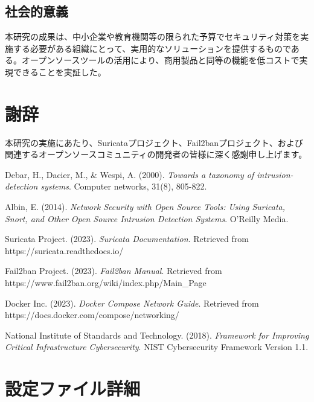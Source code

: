 \documentclass[12pt,a4paper]{article}
\begin{document}
\subsection{社会的意義}

本研究の成果は、中小企業や教育機関等の限られた予算でセキュリティ対策を実施する必要がある組織にとって、実用的なソリューションを提供するものである。オープンソースツールの活用により、商用製品と同等の機能を低コストで実現できることを実証した。

\section*{謝辞}

本研究の実施にあたり、Suricataプロジェクト、Fail2banプロジェクト、および関連するオープンソースコミュニティの開発者の皆様に深く感謝申し上げます。

\begin{thebibliography}{9}

Debar, H., Dacier, M., \& Wespi, A. (2000). 
\textit{Towards a taxonomy of intrusion-detection systems}. 
Computer networks, 31(8), 805-822.

Albin, E. (2014). 
\textit{Network Security with Open Source Tools: Using Suricata, Snort, and Other Open Source Intrusion Detection Systems}. 
O'Reilly Media.

Suricata Project. (2023). 
\textit{Suricata Documentation}. 
Retrieved from https://suricata.readthedocs.io/

Fail2ban Project. (2023). 
\textit{Fail2ban Manual}. 
Retrieved from https://www.fail2ban.org/wiki/index.php/Main\_Page

Docker Inc. (2023). 
\textit{Docker Compose Network Guide}. 
Retrieved from https://docs.docker.com/compose/networking/

National Institute of Standards and Technology. (2018). 
\textit{Framework for Improving Critical Infrastructure Cybersecurity}. 
NIST Cybersecurity Framework Version 1.1.

\end{thebibliography}

\appendix

\section{設定ファイル詳細}
\end{document}
